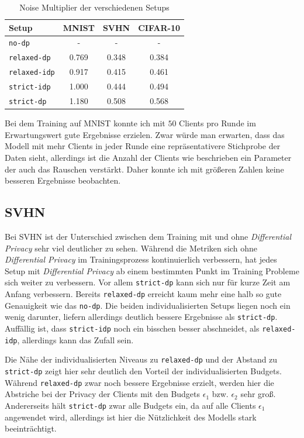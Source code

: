 \begin{table}
	\centering
	\caption{Noise Multiplier der verschiedenen Setups}
	\begin{tabular}{lccc}
		\toprule
		Setup & MNIST & SVHN & CIFAR-10 \\
		\midrule
		\texttt{no-dp} & - & - & - \\
		\texttt{relaxed-dp} & 0.769 & 0.348 & 0.384 \\
		\texttt{relaxed-idp} & 0.917 & 0.415 & 0.461 \\
		\texttt{strict-idp} & 1.000 & 0.444 & 0.494 \\
		\texttt{strict-dp} & 1.180 & 0.508 & 0.568 \\
		\bottomrule
	\end{tabular}
	\label{tab:noise-multipliers}
\end{table}

Bei dem Training auf MNIST konnte ich mit $50$ Clients pro Runde im Erwartungswert gute Ergebnisse erzielen. Zwar würde man erwarten, dass das Modell mit mehr Clients in jeder Runde eine repräsentativere Stichprobe der Daten sieht, allerdings ist die Anzahl der Clients wie beschrieben ein Parameter der auch das Rauschen verstärkt. Daher konnte ich mit größeren Zahlen keine besseren Ergebnisse beobachten.

\subsection{SVHN}

Bei SVHN ist der Unterschied zwischen dem Training mit und ohne \textit{Differential Privacy} sehr viel deutlicher zu sehen. Während die Metriken sich ohne \textit{Differential Privacy} im Trainingsprozess kontinuierlich verbessern, hat jedes Setup mit \textit{Differential Privacy} ab einem bestimmten Punkt im Training Probleme sich weiter zu verbessern. Vor allem \texttt{strict-dp} kann sich nur für kurze Zeit am Anfang verbessern. Bereits \texttt{relaxed-dp} erreicht kaum mehr eine halb so gute Genauigkeit wie das \texttt{no-dp}. Die beiden individualisierten Setups liegen noch ein wenig darunter, liefern allerdings deutlich bessere Ergebnisse als \texttt{strict-dp}. Auffällig ist, dass \texttt{strict-idp} noch ein bisschen besser abschneidet, als \texttt{relaxed-idp}, allerdings kann das Zufall sein.

Die Nähe der individualisierten Niveaus zu \texttt{relaxed-dp} und der Abstand zu \texttt{strict-dp} zeigt hier sehr deutlich den Vorteil der individualisierten Budgets. Während \texttt{relaxed-dp} zwar noch bessere Ergebnisse erzielt, werden hier die Abstriche bei der Privacy der Clients mit den Budgets $\epsilon_1$ bzw. $\epsilon_2$ sehr groß. Andererseits hält \texttt{strict-dp} zwar alle Budgets ein, da auf alle Clients $\epsilon_1$ angewendet wird, allerdings ist hier die Nützlichkeit des Modells stark beeinträchtigt.

